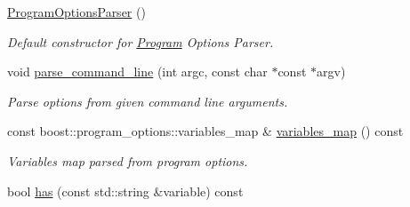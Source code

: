 \begin{DoxyCompactItemize}
\item 
\hyperlink{classsocketplay_1_1ProgramOptionsParser_a2e0d3b6136470b57be905a20ba8c1db7}{Program\+Options\+Parser} ()\hypertarget{classsocketplay_1_1ProgramOptionsParser_a2e0d3b6136470b57be905a20ba8c1db7}{}\label{classsocketplay_1_1ProgramOptionsParser_a2e0d3b6136470b57be905a20ba8c1db7}

\begin{DoxyCompactList}\small\item\em Default constructor for \hyperlink{classsocketplay_1_1Program}{Program} Options Parser. \end{DoxyCompactList}\item 
void \hyperlink{classsocketplay_1_1ProgramOptionsParser_ac3a2c72b6b7def4556e1f71f4a7f3c3a}{parse\+\_\+command\+\_\+line} (int argc, const char $\ast$const $\ast$argv)
\begin{DoxyCompactList}\small\item\em Parse options from given command line arguments. \end{DoxyCompactList}\item 
const boost\+::program\+\_\+options\+::variables\+\_\+map \& \hyperlink{classsocketplay_1_1ProgramOptionsParser_a9b01f381d32504969c720c03f85cba3e}{variables\+\_\+map} () const \hypertarget{classsocketplay_1_1ProgramOptionsParser_a9b01f381d32504969c720c03f85cba3e}{}\label{classsocketplay_1_1ProgramOptionsParser_a9b01f381d32504969c720c03f85cba3e}

\begin{DoxyCompactList}\small\item\em Variables map parsed from program options. \end{DoxyCompactList}\item 
bool \hyperlink{classsocketplay_1_1ProgramOptionsParser_a220bfd81a57fb5aa3ff969b8539ceb61}{has} (const std\+::string \&variable) const \hypertarget{classsocketplay_1_1ProgramOptionsParser_a220bfd81a57fb5aa3ff969b8539ceb61}{}\label{classsocketplay_1_1ProgramOptionsParser_a220bfd81a57fb5aa3ff969b8539ceb61}


\end{DoxyCompactItemize}
